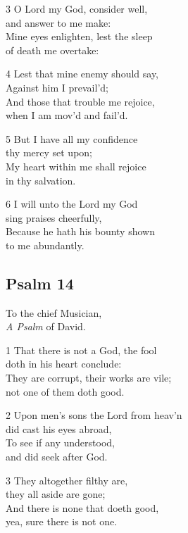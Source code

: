 3 O Lord my God, consider well,\\
and answer to me make:\\
Mine eyes enlighten, lest the sleep\\
of death me overtake:

4 Lest that mine enemy should say,\\
Against him I prevail’d;\\
And those that trouble me rejoice,\\
when I am mov’d and fail’d.

5 But I have all my confidence\\
thy mercy set upon;\\
My heart within me shall rejoice\\
in thy salvation.

6 I will unto the Lord my God\\
sing praises cheerfully,\\
Because he hath his bounty shown\\
to me abundantly.

\begin{center}
\quad{}\quad{}
\end{center}

\subsection*{Psalm 14  }

To the chief Musician,\\
\emph{A Psalm} of David.

1 That there is not a God, the fool\\
doth in his heart conclude:\\
They are corrupt, their works are vile;\\
not one of them doth good.

2 Upon men’s sons the Lord from heav’n\\
did cast his eyes abroad,\\
To see if any understood,\\
and did seek after God.

3 They altogether filthy are,\\
they all aside are gone;\\
And there is none that doeth good,\\
yea, sure there is not one.

